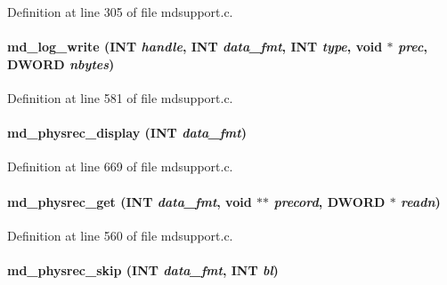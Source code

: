 Definition at line 305 of file mdsupport.c.
\paragraph[{md\_\-log\_\-write}]{ md\_\-log\_\-write ({\bf INT} {\em handle}, \/  {\bf INT} {\em data\_\-fmt}, \/  {\bf INT} {\em type}, \/  void $\ast$ {\em prec}, \/  {\bf DWORD} {\em nbytes})}\hfill\label{group__mdsupportincludecode_gababc666fd163160035e875cc9bcfd5c4}


Definition at line 581 of file mdsupport.c.
\paragraph[{md\_\-physrec\_\-display}]{ md\_\-physrec\_\-display ({\bf INT} {\em data\_\-fmt})}\hfill\label{group__mdsupportincludecode_ga51878199698a5c8a4304eab03538d54f}


Definition at line 669 of file mdsupport.c.
\paragraph[{md\_\-physrec\_\-get}]{ md\_\-physrec\_\-get ({\bf INT} {\em data\_\-fmt}, \/  void $\ast$$\ast$ {\em precord}, \/  {\bf DWORD} $\ast$ {\em readn})}\hfill\label{group__mdsupportincludecode_gac2ab9aeb94f35e215dcbf5e0f8221662}


Definition at line 560 of file mdsupport.c.
\paragraph[{md\_\-physrec\_\-skip}]{ md\_\-physrec\_\-skip ({\bf INT} {\em data\_\-fmt}, \/  {\bf INT} {\em bl})}\hfill\label{group__mdsupportincludecode_ga4d23ab201e33f0ea7639f674d71807f4}


